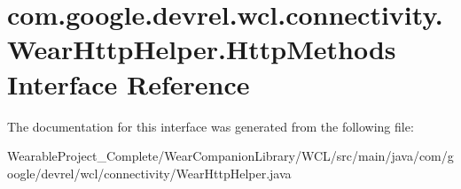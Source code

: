 \hypertarget{interfacecom_1_1google_1_1devrel_1_1wcl_1_1connectivity_1_1WearHttpHelper_1_1HttpMethods}{}\section{com.\+google.\+devrel.\+wcl.\+connectivity.\+Wear\+Http\+Helper.\+Http\+Methods Interface Reference}
\label{interfacecom_1_1google_1_1devrel_1_1wcl_1_1connectivity_1_1WearHttpHelper_1_1HttpMethods}


The documentation for this interface was generated from the following file\+:\begin{DoxyCompactItemize}
\item 
Wearable\+Project\+\_\+\+Complete/\+Wear\+Companion\+Library/\+W\+C\+L/src/main/java/com/google/devrel/wcl/connectivity/Wear\+Http\+Helper.\+java\end{DoxyCompactItemize}

